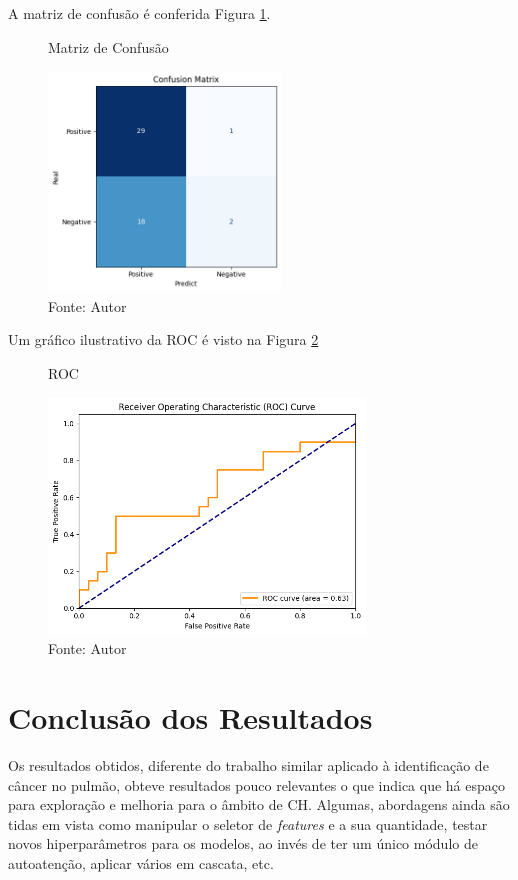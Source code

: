 A matriz de confusão é conferida Figura \ref{fig:fig016}.

\begin{figure}[htbp]
    \caption{Matriz de Confusão}
    \centering
    \includegraphics[width=0.55\textwidth]{figures/fig016.png}
    \caption*{Fonte: Autor}
    \label{fig:fig016}
\end{figure}

Um gráfico ilustrativo da \gls{ROC} é visto na Figura \ref{fig:fig017}

\begin{figure}[htbp]
    \caption{ROC}
    \centering
    \includegraphics[width=0.75\textwidth]{figures/fig017.png}
    \caption*{Fonte: Autor}
    \label{fig:fig017}
\end{figure}

\section{Conclusão dos Resultados} 
\label{sec:cap6_conclusãp_resultados}

Os resultados obtidos, diferente do trabalho similar aplicado à identificação de câncer no pulmão, obteve resultados pouco relevantes o que indica que há espaço para exploração e melhoria para o âmbito de \gls{CH}. Algumas, abordagens ainda são tidas em vista como manipular o seletor de \textit{features} e a sua quantidade, testar novos hiperparâmetros para os modelos, ao invés de ter um único módulo de autoatenção, aplicar vários em cascata, etc.





